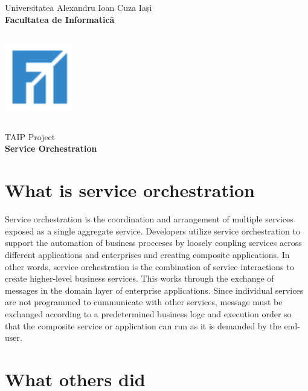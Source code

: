 \documentclass[12pt, oneside]{article}
\begin{document}
\begin{titlepage}
\begin{center}
\vspace*{1cm}
{\Huge Universitatea Alexandru Ioan Cuza Iași} \\
\vspace{0.5cm}
{\huge \textbf{Facultatea de Informatică}} \\
\vspace{1.5cm}
\includegraphics[width=3cm,height=4.5cm,keepaspectratio]{logo_fii3.png} \\
\vspace{1cm}
TAIP Project \\ 
\vspace{0.5cm}
{\Huge \textbf{Service Orchestration}} \\
\vspace{1cm}


\vspace{1cm}
\end{center}
\end{titlepage}
	\section{What is service orchestration}
	Service orchestration is the coordination and arrangement of multiple services exposed as a single aggregate service. Developers utilize service orchestration to support the automation of business procceses by loosely coupling services across different applications and enterprises and creating composite applications. In other words, service orchestration is the combination of service interactions to create higher-level business services. This works through the exchange of messages in the domain layer of enterprise applications. Since individual services are not programmed to cummunicate with other services, message must be exchanged according to a predetermined business logc and execution order so that the composite service or application can run as it is demanded by the end-user. 

	\section{What others did}
\end{document}
